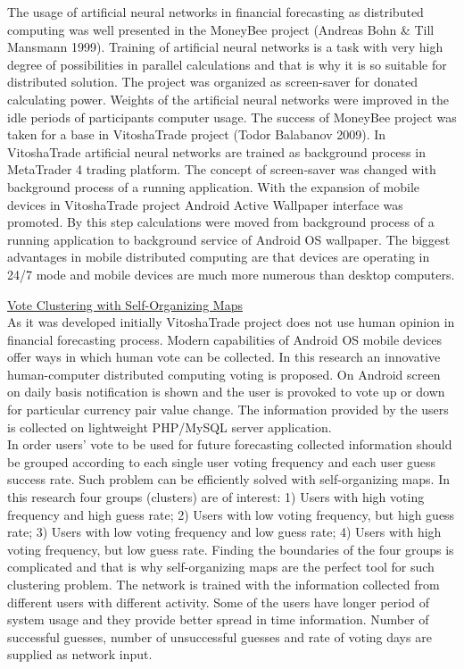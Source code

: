 \documentclass{article}
\begin{document}
The usage of artificial neural networks in financial forecasting as distributed computing was well presented in the MoneyBee project (Andreas Bohn \& Till Mansmann 1999). Training of artificial neural networks is a task with very high degree of possibilities in parallel calculations and that is why it is so suitable for distributed solution. The project was organized as screen-saver for donated calculating power. Weights of the artificial neural networks were improved in the idle periods of participants computer usage. The success of MoneyBee project was taken for a base in VitoshaTrade project (Todor Balabanov 2009). In VitoshaTrade artificial neural networks are trained as background process in MetaTrader 4 trading platform. The concept of screen-saver was changed with background process of a running application. With the expansion of mobile devices in VitoshaTrade project Android Active Wallpaper interface was promoted. By this step calculations were moved from background process of a running application to background service of Android OS wallpaper. The biggest advantages in mobile distributed computing are that devices are operating in 24/7 mode and mobile devices are much more numerous than desktop computers.

\vspace*{3mm}
\underline{Vote Clustering with Self-Organizing Maps} \\

As it was developed initially VitoshaTrade project does not use human opinion in financial forecasting process. Modern capabilities of Android OS mobile devices offer ways in which human vote can be collected. In this research an innovative human-computer distributed computing voting is proposed. On Android screen on daily basis notification is shown and the user is provoked to vote up or down for particular currency pair value change. The information provided by the users is collected on lightweight PHP/MySQL server application. \\

In order users' vote to be used for future forecasting collected information should be grouped according to each single user voting frequency and each user guess success rate. Such problem can be efficiently solved with self-organizing maps. In this research four groups (clusters) are of interest: 1) Users with high voting frequency and high guess rate; 2) Users with low voting frequency, but high guess rate; 3) Users with low voting frequency and low guess rate; 4) Users with high voting frequency, but low guess rate. Finding the boundaries of the four groups is complicated and that is why self-organizing maps are the perfect tool for such clustering problem. The network is trained with the information collected from different users with different activity. Some of the users have longer period of system usage and they provide better spread in time information. Number of successful guesses, number of unsuccessful guesses and rate of voting days are supplied as network input. \\
\end{document}
